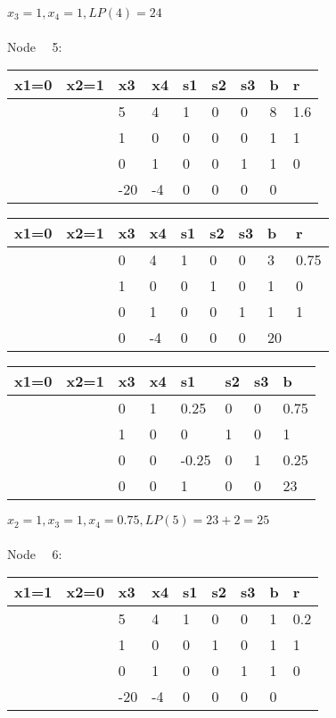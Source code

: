 \documentclass{article} %
\numberwithin{equation}{section} %
\numberwithin{figure}{section} %
\numberwithin{table}{section} %
\begin{document}
$x_3=1,x_4=1,LP(4)=24$
\\
\\
Node \ \ 5:
\begin{center}
\begin{tabular}{|l|l|l|l|l|l|l|l|l|}
\hline
x1=0 & x2=1 & x3  & x4 & s1 & s2 & s3 & b & r   \\ \hline
     &      & 5   & 4  & 1  & 0  & 0  & 8 & 1.6 \\ \hline
     &      & 1   & 0  & 0  & 0  & 0  & 1 & 1   \\ \hline
     &      & 0   & 1  & 0  & 0  & 1  & 1 & 0   \\ \hline
     &      & -20 & -4 & 0  & 0  & 0  & 0 &     \\ \hline
\end{tabular}
\end{center}
\begin{center}
\begin{tabular}{|l|l|l|l|l|l|l|l|l|}
\hline
x1=0 & x2=1 & x3 & x4 & s1 & s2 & s3 & b  & r    \\ \hline
     &      & 0  & 4  & 1  & 0  & 0  & 3  & 0.75 \\ \hline
     &      & 1  & 0  & 0  & 1  & 0  & 1  & 0    \\ \hline
     &      & 0  & 1  & 0  & 0  & 1  & 1  & 1    \\ \hline
     &      & 0  & -4 & 0  & 0  & 0  & 20 &      \\ \hline
\end{tabular}
\end{center}
\begin{center}
\begin{tabular}{|l|l|l|l|l|l|l|l|}
\hline
x1=0 & x2=1 & x3 & x4 & s1    & s2 & s3 & b    \\ \hline
     &      & 0  & 1  & 0.25  & 0  & 0  & 0.75 \\ \hline
     &      & 1  & 0  & 0     & 1  & 0  & 1    \\ \hline
     &      & 0  & 0  & -0.25 & 0  & 1  & 0.25 \\ \hline
     &      & 0  & 0  & 1     & 0  & 0  & 23   \\ \hline
\end{tabular}
\end{center}
$x_2=1,x_3=1,x_4=0.75,LP(5)=23+2=25$
\\
\\
Node \ \ 6:
\begin{center}
\begin{tabular}{|l|l|l|l|l|l|l|l|l|}
\hline
x1=1 & x2=0 & x3  & x4 & s1 & s2 & s3 & b & r   \\ \hline
     &      & 5   & 4  & 1  & 0  & 0  & 1 & 0.2 \\ \hline
     &      & 1   & 0  & 0  & 1  & 0  & 1 & 1   \\ \hline
     &      & 0   & 1  & 0  & 0  & 1  & 1 & 0   \\ \hline
     &      & -20 & -4 & 0  & 0  & 0  & 0 &     \\ \hline
\end{tabular}
\end{center}
\end{document}
